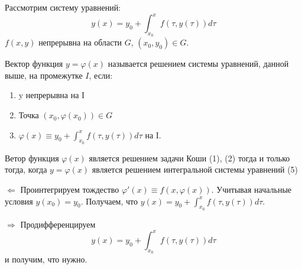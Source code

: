 \documentclass[document.tex]{subfiles}
\begin{document}
Рассмотрим систему уравнений:
$$y(x) = y_0 + \int_{x_0}^x f(\tau, y(\tau))d\tau$$
$f(x, y)$ непрерывна на области $G$, $(x_0, y_0) \in G$.

\begin{definition}
Вектор функция $y = \varphi(x)$ называется решением системы уравнений, данной выше, на промежутке $I$, если:
\begin{enumerate}
\item y непрерывна на I
\item Точка $(x_0, \varphi(x_0)) \in G$
\item $\varphi(x) \equiv y_0 + \int_{x_0}^x f(\tau, y(\tau))d\tau$ на I.
\end{enumerate}
\end{definition}

\begin{Lemma}
Ветор функция $\varphi(x)$ является решением задачи Коши (1), (2) тогда и только тогда, когда $y = \varphi(x)$ является решением интегральной системы уравнений (5)
\end{Lemma}
\begin{Proof}
$\Leftarrow$ Проинтегрируем тождество $\varphi'(x) \equiv f(x, \varphi(x))$. Учитывая начальные условия $y(x_0) = y_0$. Получаем, что $y(x) = y_0 + \int_{x_0}^x f(\tau, y(\tau)) d\tau$.

$\Rightarrow$ Продифференцируем 
$$y(x) = y_0 + \int_{x_0}^x f(\tau, y(\tau))d\tau$$
и получим, что нужно.
\end{Proof}
\end{document}
